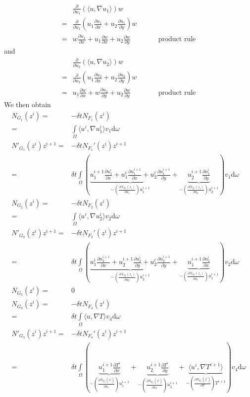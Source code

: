 \documentclass{article}
\begin{document}
\begin{align*}
&\frac{\partial}{\partial u_1}(\langle u,\nabla u_1\rangle) w \\
=& \frac{\partial}{\partial u_1}(u_1 \frac{\partial u_1}{\partial x} + u_2 \frac{\partial u_1}{\partial y}) w\\
=& w\frac{\partial u_1}{\partial x}+ u_1\frac{\partial w}{\partial x}+ u_2 \frac{\partial w}{\partial y}\qquad \qquad \text{product rule}
\end{align*}
and 
\begin{align*}
&\frac{\partial}{\partial u_2}(\langle u,\nabla u_2\rangle) w  \\
=& \frac{\partial}{\partial u_2}(u_1 \frac{\partial u_2}{\partial x} + u_2 \frac{\partial u_2}{\partial y}) w\\
=& u_1\frac{\partial w}{\partial x}+ w\frac{\partial u_2}{\partial y}+ u_2 \frac{\partial w}{\partial y}\qquad \qquad \text{product rule}
\end{align*}
We then obtain
\begin{align*}
N_{G_1}(z^i) = &-\delta t N_{F_1}(z^i)\\
= &\int\limits_\Omega \langle u^i ,\nabla u_1^i \rangle v_1 \text{d}\omega\\
N'_{G_1}(z^i)z^{i+1} = &-\delta t N_{F_1}'(z^i)z^{i+1}\\
= &\delta t\int\limits_\Omega ( \underbrace{u_1^{i+1}\frac{\partial u_1^i}{\partial x} + u_1^i\frac{\partial u_1^{i+1}}{\partial x} + u_2^{i}\frac{\partial u_1^{i+1}}{\partial y}}_{-(\frac{\partial N_{F_1}(z_i)}{\partial u_1})u_1^{i+1}} 
+ \underbrace{ u_2^{i+1} \frac{\partial u_1^i}{\partial y}}_{-(\frac{\partial N_{F_1}(z_i)}{\partial u_2})u_2^{i+1}} ) v_1\text{d}\omega \\
N_{G_2}(z^i) = &-\delta t N_{F_2}(z^i)\\
= &\int\limits_\Omega \langle u^i ,\nabla u_2^i \rangle v_2 \text{d}\omega\\
N'_{G_2}(z^i)z^{i+1} = &-\delta t N_{F_2}'(z^i)z^{i+1}\\
= & \delta t\int\limits_\Omega ( \underbrace{u_1^{i}\frac{\partial u_2^{i+1}}{\partial x} + u_2^{i+1}\frac{\partial u_2^{i}}{\partial y} + u_2^{i}\frac{\partial u_2^{i+1}}{\partial y}}_{-(\frac{\partial N_{F_2}(z_i)}{\partial u_2})u_2^{i+1}} 
+ \underbrace{ u_1^{i+1} \frac{\partial u_2^i}{\partial x}}_{-(\frac{\partial N_{F_2}(z_i)}{\partial u_1})u_1^{i+1}} ) v_2\text{d}\omega \\
N_{G_3}(z^i) =& 0 \\
N_{G_4}(z^i) =& -\delta t N_{F_4}(z^i)\\
=& \delta t\int\limits_\Omega \langle u,\nabla T\rangle v_4 \text{d}\omega \\
N'_{G_4}(z^i)z^{i+1} = &-\delta t N_{F_4}'(z^i)z^{i+1}\\
=& \delta t \int\limits_\Omega  (\underbrace{u_1^{i+1}\frac{\partial T^{i}}{\partial x}}_{-(\frac{\partial N_{F_4}(z^i)}{\partial u_1})u_1^{i+1}}+ \underbrace{u_2^{i+1}\frac{\partial T^{i}}{\partial y}}_{-(\frac{\partial N_{F_4}(z^i)}{\partial u_2})u_2^{i+1} }+\underbrace{\langle u^i,\nabla T^{i+1}\rangle }_{-(\frac{\partial N_{F_4}(z^i)}{\partial T})T^{i+1}})v_4 \text{d}\omega
\end{align*}
\end{document}
